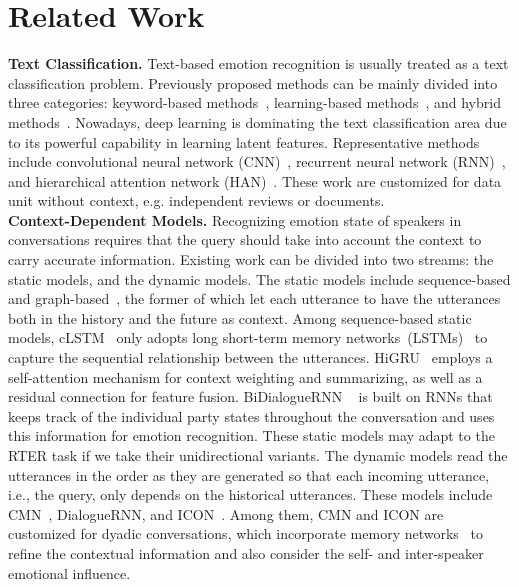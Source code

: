 \documentclass[letterpaper]{article} %
\begin{document}
\section{Related Work}

\noindent\textbf{Text Classification.}
Text-based emotion recognition is usually treated as a text classification problem. Previously proposed methods can be mainly divided into three categories: keyword-based methods~\cite{DBLP:conf/aaai/WilsonWH04}, learning-based methods~\cite{DBLP:conf/webi/YangLC07}, and hybrid methods~\cite{DBLP:journals/talip/WuCL06}.
Nowadays, deep learning is dominating the text classification area due to its powerful capability in learning latent features. Representative methods include convolutional neural network (CNN)~\cite{DBLP:conf/emnlp/Kim14}, recurrent neural network (RNN)~\cite{DBLP:conf/acl/Abdul-MageedU17}, and hierarchical attention network (HAN)~\cite{DBLP:conf/emnlp/TangQL15}. These work are customized for data unit without context, e.g. independent reviews or documents.
\\[1ex]
\noindent\textbf{Context-Dependent Models.}
Recognizing emotion state of speakers in conversations requires that the query should take into account the context to carry accurate information. Existing work can be divided into two streams: the static models, and the dynamic models. The static models include sequence-based and graph-based~\cite{DBLP:conf/ijcai/ZhangWSLZZ19,DBLP:journals/corr/abs-1908-11540}, the former of which let each utterance to have the utterances both in the history and the future as context. Among sequence-based static models, cLSTM~\cite{DBLP:conf/acl/PoriaCHMZM17} only adopts long short-term memory networks~(LSTMs)~\cite{DBLP:journals/neco/HochreiterS97} to capture the sequential relationship between the utterances. HiGRU~\cite{DBLP:conf/naacl/JiaoYKL19} employs a self-attention mechanism for context weighting and summarizing, as well as a residual connection for feature fusion. BiDialogueRNN ~\cite{DBLP:conf/aaai/MajumderPHMGC19} is built on RNNs that keeps track of the individual party states throughout the conversation and uses this information for emotion recognition. These static models may adapt to the RTER task if we take their unidirectional variants. The dynamic models read the utterances in the order as they are generated so that each incoming utterance, i.e., the query, only depends on the historical utterances. These models include CMN~\cite{DBLP:conf/naacl/HazarikaPZCMZ18}, DialogueRNN, and ICON~\cite{DBLP:conf/emnlp/HazarikaPMCZ18}. Among them, CMN and ICON are customized for dyadic conversations, which incorporate memory networks~\cite{DBLP:conf/nips/SukhbaatarSWF15} to refine the contextual information and also consider the self- and inter-speaker emotional influence.
\end{document}
